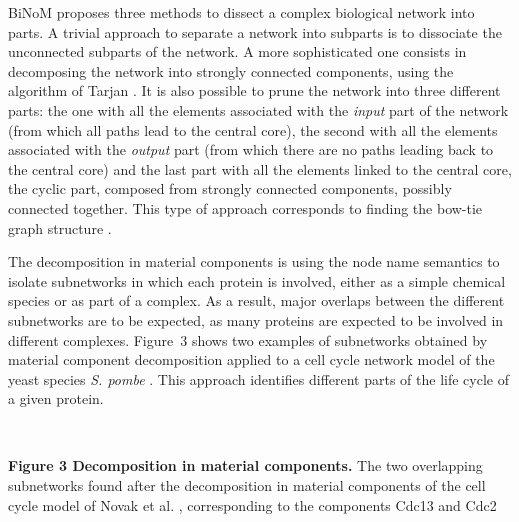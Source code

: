 \documentclass[11pt]{bmc_article_s50}
\newenvironment{bmcformat}{\begin{raggedright}\baselineskip20pt\sloppy\setboolean{publ}{false}}{\end{raggedright}\baselineskip20pt\sloppy}
\begin{document}
\begin{bmcformat}
BiNoM proposes three methods to dissect a complex biological network into parts.
A trivial approach to separate a network into subparts is to dissociate the unconnected subparts
of the network. A more sophisticated one consists in decomposing the network into
strongly connected components, using the algorithm of Tarjan
\cite{tarjan1972depth}. It is also possible to prune the network into three different parts:
the one with all the elements associated with the \emph{input} part of the network (from which all paths lead to the central core), the
second with all the elements associated with the \emph{output} part (from which there are no paths leading back to the central core) and the last
part with all the elements linked to the central core, the cyclic part, composed from strongly connected components, possibly connected together.
This type of approach corresponds to finding the bow-tie graph structure \cite{broder2000graph}.

The decomposition in material components is using the node name semantics to
isolate subnetworks in which each protein is involved, either as a simple chemical species or as part of a complex. As a result, major overlaps between
the different subnetworks are to be expected, as many proteins are expected to be involved in
different complexes. Figure~3 shows two examples of subnetworks
obtained by material component decomposition applied to a cell cycle network
model of the yeast species \textit{S. pombe} \cite{novak1998model}. This approach identifies
different parts of the life cycle of a given protein.

\vspace{-6pt}
\hrulefill\

\vspace*{-15pt}
\textbf{Figure 3 Decomposition in material components.}
The two overlapping subnetworks found after the decomposition in material components of the cell cycle model of Novak et al. \cite{novak1998model}, corresponding to the components Cdc13 and
Cdc2

\vspace*{-23pt}

\hrulefill\
\vspace{-5pt}



\end{bmcformat}
\end{document}
